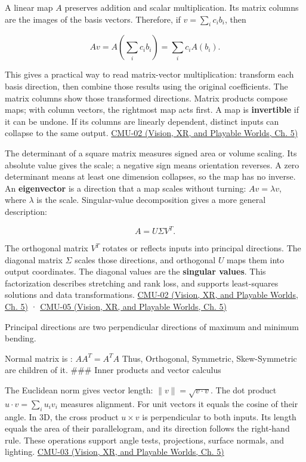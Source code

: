A linear map \(A\) preserves addition and scalar multiplication. Its matrix columns are the images of the basis vectors. Therefore, if \(v=\sum_i c_i b_i\), then

\[
Av=A\left(\sum_i c_i b_i\right)=\sum_i c_iA(b_i).
\]

This gives a practical way to read matrix-vector multiplication: transform each basis direction, then combine those results using the original coefficients. The matrix columns show those transformed directions. Matrix products compose maps; with column vectors, the rightmost map acts first. A map is \textbf{invertible} if it can be undone. If its columns are linearly dependent, distinct inputs can collapse to the same output. \href{../07-Vision-XR-and-Playable-Worlds/main.pdf\#nameddest=04-visual-computing-ii-ch036-cmu-02---linear-algebra-preview}{CMU-02 (Vision, XR, and Playable Worlds, Ch. 5)}

The determinant of a square matrix measures signed area or volume scaling. Its absolute value gives the scale; a negative sign means orientation reverses. A zero determinant means at least one dimension collapses, so the map has no inverse. An \textbf{eigenvector} is a direction that a map scales without turning: \(Av=\lambda v\), where \(\lambda\) is the scale. Singular-value decomposition gives a more general description:

\[
A=U\Sigma V^T.
\]

The orthogonal matrix \(V^T\) rotates or reflects inputs into principal directions. The diagonal matrix \(\Sigma\) scales those directions, and orthogonal \(U\) maps them into output coordinates. The diagonal values are the \textbf{singular values}. This factorization describes stretching and rank loss, and supports least-squares solutions and data transformations. \href{../07-Vision-XR-and-Playable-Worlds/main.pdf\#nameddest=04-visual-computing-ii-ch036-cmu-02---linear-algebra-preview}{CMU-02 (Vision, XR, and Playable Worlds, Ch. 5)} · \href{../07-Vision-XR-and-Playable-Worlds/main.pdf\#nameddest=04-visual-computing-ii-ch036-cmu-05---spatial-transformations}{CMU-05 (Vision, XR, and Playable Worlds, Ch. 5)}

Principal directions are two perpendicular directions of maximum and minimum bending.

Normal matrix is : \(AA^T = A^T A\) Thus, Orthogonal, Symmetric, Skew-Symmetric are children of it. \#\#\# Inner products and vector calculus

The Euclidean norm gives vector length: \(\|v\|=\sqrt{v\cdot v}\). The dot product \(u\cdot v=\sum_i u_iv_i\) measures alignment. For unit vectors it equals the cosine of their angle. In 3D, the cross product \(u\times v\) is perpendicular to both inputs. Its length equals the area of their parallelogram, and its direction follows the right-hand rule. These operations support angle tests, projections, surface normals, and lighting. \href{../07-Vision-XR-and-Playable-Worlds/main.pdf\#nameddest=04-visual-computing-ii-ch036-cmu-03---vector-calculus-preview}{CMU-03 (Vision, XR, and Playable Worlds, Ch. 5)}

